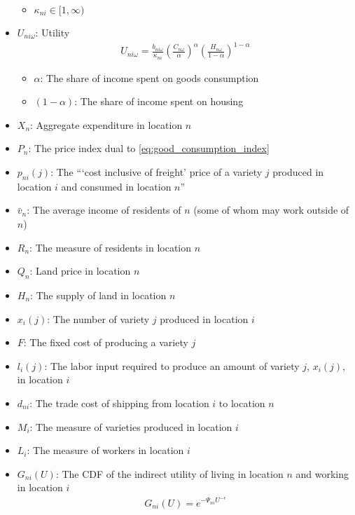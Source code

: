 \begin{itemize}
\begin{itemize}
            \item $\kappa_{n i} \in[1, \infty)$
        \end{itemize}
    \item $U_{n i \omega}$: Utility
        \begin{align}
            U_{n i \omega}=\frac{b_{n i \omega}}{\kappa_{n i}}\left(\frac{C_{n \omega}}{\alpha}\right)^\alpha\left(\frac{H_{n \omega}}{1-\alpha}\right)^{1-\alpha}
        \end{align}
        \begin{itemize}
            \item $\alpha$: The share of income spent on goods consumption
            \item $(1-\alpha)$: The share of income spent on housing
        \end{itemize}
    \item $X_n$: Aggregate expenditure in location $n$
    \item $P_n$: The price index dual to \eqref{eq:good_consumption_index}
    \item $p_{n i}(j)$: The  ```cost inclusive of freight' price of a variety $j$ produced in location $i$ and consumed in location $n$''
    \item $\bar{v}_n$: The average income of residents of $n$ (some of whom may work outside of $n$)
    \item $R_n$: The measure of residents in location $n$
    \item $Q_n$: Land price in location $n$
    \item $H_n$: The supply of land in location $n$
    \item $x_i(j)$: The number of variety $j$ produced in location $i$
    \item $F$: The fixed cost of producing a variety $j$
    \item $l_i(j)$: The labor input required to produce an amount of variety $j$, $x_i(j)$, in location $i$
    \item $d_{ni}$: The trade cost of shipping from location $i$ to location $n$
    \item $M_i$: The measure of varieties produced in location $i$
    \item $L_i$: The measure of workers in location $i$
    \item $G_{ni}(U)$: The CDF of the indirect utility of living in location $n$ and working in location $i$
        \begin{align}
            G_{n i}(U)=e^{-\Psi_{n i} U^{-\epsilon}}

\end{align}
\end{itemize}
